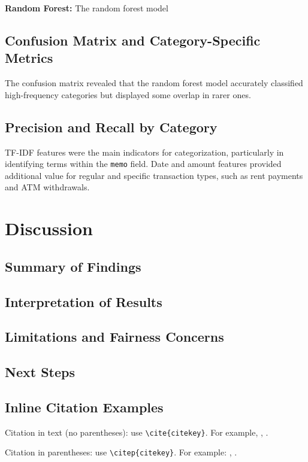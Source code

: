 \documentclass[12pt,letterpaper]{article}
\begin{document}
\textbf{Random Forest:} The random forest model

\subsection{Confusion Matrix and Category-Specific Metrics}
The confusion matrix revealed that the random forest model accurately classified high-frequency categories but displayed some overlap in rarer ones.

\subsection{Precision and Recall by Category}
TF-IDF features were the main indicators for categorization, particularly in identifying terms within the \texttt{memo} field. Date and amount features provided additional value for regular and specific transaction types, such as rent payments and ATM withdrawals.


\section{Discussion}
\subsection{Summary of Findings}

\subsection{Interpretation of Results}

\subsection{Limitations and Fairness Concerns}

\subsection{Next Steps}

\subsection{Inline Citation Examples}
Citation in text (no parentheses): use \texttt{{\textbackslash}cite\{citekey\}}. 
For example, \cite{breiman2011}, \cite{devlin2019bert}.

Citation in parentheses: use \texttt{{\textbackslash}citep\{citekey\}}. 
For example: \citep{vaswani2023attention}, \citep{karras2019stylebased}.
\end{document}
